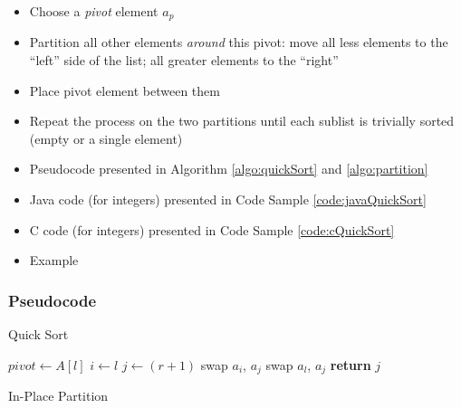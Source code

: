 \begin{itemize}
  \item Choose a \emph{pivot} element $a_p$
  \item Partition all other elements \emph{around} this pivot: move all less elements to the ``left'' side of the list; all greater elements to the ``right''
  \item Place pivot element between them
  \item Repeat the process on the two partitions until each sublist is trivially sorted (empty or a single element)
  \item Pseudocode presented in Algorithm \ref{algo:quickSort} and \ref{algo:partition}
  \item Java code (for integers) presented in Code Sample \ref{code:javaQuickSort}
  \item C code (for integers) presented in Code Sample \ref{code:cQuickSort}
  \item Example
\end{itemize}

\subsubsection{Pseudocode}

    \begin{algorithm}[H]
    \caption{Quick Sort}
    \label{algo:quickSort}
    \end{algorithm}

    \begin{algorithm}[H]
     $pivot \leftarrow A[l]$ \; %
     $i \leftarrow l$ \;
     $j \leftarrow (r+1)$ \;
       swap $a_i$, $a_j$ 
       swap $a_l$, $a_j$ 
    \textbf{return} $j$ \;
    \caption{In-Place Partition}
    \label{algo:partition}
    \end{algorithm}

